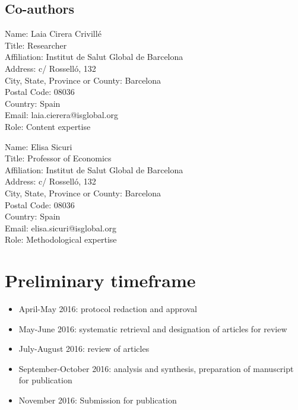 \documentclass{article}
\begin{document}
\subsection*{Co-authors}

Name: Laia Cirera Crivillé\\
Title: Researcher\\
Affiliation: Institut de Salut Global de Barcelona\\
Address: c/ Rosselló, 132\\
City, State, Province or County: Barcelona\\
Postal Code: 08036\\
Country: Spain\\
Email: laia.cierera@isglobal.org\\
Role: Content expertise\\


\vspace{5mm}

\noindent Name: Elisa Sicuri\\
Title: Professor of Economics\\
Affiliation: Institut de Salut Global de Barcelona\\
Address: c/ Rosselló, 132\\
City, State, Province or County: Barcelona\\
Postal Code: 08036\\
Country: Spain\\
Email: elisa.sicuri@isglobal.org\\
Role: Methodological expertise\\


\section*{Preliminary timeframe}

\begin{itemize}
  \setlength\itemsep{-0.2em}
\item April-May 2016: protocol redaction and approval
\item May-June 2016: systematic retrieval and designation of articles for review
\item July-August 2016: review of articles
\item September-October 2016: analysis and synthesis, preparation of manuscript for publication
\item November 2016: Submission for publication
\end{itemize}
\end{document}
